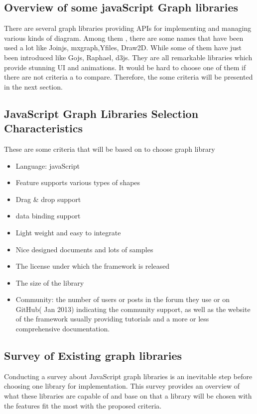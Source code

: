 \documentclass[14pt,a4paper]{extreport}
\begin{document}
 		\subsection{Overview of some javaScript Graph libraries}
 		There are several graph libraries providing APIs for implementing and managing various kinds of diagram. Among them , there are some names that have been used a lot like Joinjs, mxgraph,Yfiles, Draw2D. While some of them have just been introduced like Gojs, Raphael, d3js. They are all remarkable libraries which provide stunning UI and animations. It would be hard to choose one of them if there are not criteria a to compare. Therefore, the some criteria will be presented in the next section.
 			
	 			 			
		\subsection{JavaScript Graph Libraries Selection Characteristics} 		
		These are some criteria that will be based on to choose graph library
		\begin{itemize}
		\item Language: javaScript
		\item Feature supports various types of shapes
		\item Drag \& drop support
		\item data binding support
		\item Light weight and easy to integrate
		\item Nice designed documents and lots of samples
		\item The license under which the framework is released
		\item The size of the library
		\item Community: the number of users or posts in the forum they use or on GitHub( Jan 2013) indicating the community support, as well as the website of the framework usually providing tutorials and a more or less comprehensive documentation.
		\end{itemize}
		\subsection{Survey of Existing graph libraries }
		Conducting a survey about JavaScript graph libraries is an inevitable step before choosing one library for implementation. This survey provides an overview of what these libraries are capable of and base on that a library will be chosen with the features fit the most with the proposed criteria.
 			
\end{document}
